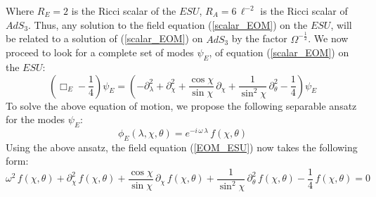 %
%
Where $R_E = 2$ is the Ricci scalar of the $ESU$, $R_A = 6 \, \ell^{-2}$ is the Ricci scalar of $AdS_3$. Thus, any solution to the field equation (\ref{scalar_EOM}) on the $ESU$, will be related to a solution of (\ref{scalar_EOM}) on $AdS_3$ by the factor $\Omega^{-\frac{1}{2}}$. We now proceed to look for a complete set of modes $\psi_E$, of equation (\ref{scalar_EOM}) on the $ESU$:
%
%
%
%
%
%
%
%
%
%
%
%
%
\begin{equation}\label{EOM_ESU}
\left( \Box_E - \frac{1}{4} \right) \psi_E
= \left(
-\partial^2_{\lambda}
+ \partial^2_{\chi} 
+ \frac{\cos \chi}{\sin \chi} \, \partial_{\chi}
+ \frac{1}{\sin^2 \chi} \, \partial^2_{\theta}
- \frac{1}{4}
\right) \psi_E
\end{equation}
%
%
%
%
%
%
To solve the above equation of motion, we propose the following separable ansatz for the modes $\psi_E$:
%
%
\begin{equation}
\phi_E(\lambda, \chi, \theta) = e^{-i \, \omega \, \lambda} \, f(\chi, \theta)
\end{equation}
%
%
Using the above ansatz, the field equation (\ref{EOM_ESU}) now takes the following form:
%
%
\begin{equation}
\omega^2 \, f(\chi, \theta)
+ \partial^2_{\chi} \, f(\chi, \theta)
+ \frac{\cos \chi}{\sin \chi} \, \partial_{\chi} \, f(\chi, \theta)
+ \frac{1}{\sin^2 \chi} \, \partial^2_{\theta} \, f(\chi, \theta)
- \frac{1}{4} \, f(\chi, \theta)
= 0
\end{equation}
